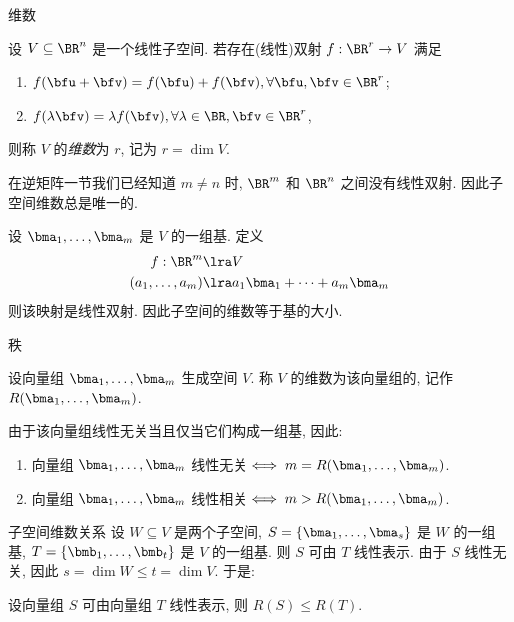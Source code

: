 \begin{frame}{维数}
	\onslide<+->
	\begin{definition}
		设 $V\subseteq \BR^n$ 是一个线性子空间.
		若存在(线性)双射 $f:\BR^r\to V$ 满足
		\begin{enumerate}[<*>]
			\item $f(\bfu+\bfv)=f(\bfu)+f(\bfv),\forall \bfu,\bfv\in\BR^r$;
			\item $f(\lambda\bfv)=\lambda f(\bfv),\forall \lambda\in\BR,\bfv\in\BR^r$,
		\end{enumerate}
		则称 $V$ 的\emph{维数}为 $r$, 记为 $r=\dim V$.
	\end{definition}
	\onslide<+->
	在逆矩阵一节我们已经知道 $m\neq n$ 时, $\BR^m$ 和 $\BR^n$ 之间没有线性双射.
	\onslide<+->
	因此子空间维数总是唯一的.

	\onslide<+->
	设 $\bma_1,\dots,\bma_m$ 是 $V$ 的一组基.
	\onslide<+->
	定义
	\begin{align*}
		f:\BR^m&\lra V\\
		(a_1,\dots,a_m)&\lra a_1\bma_1+\cdots+a_m\bma_m
	\end{align*}
	\onslide<+->
	则该映射是线性双射.
	\onslide<+->
	因此子空间的\alert{维数等于基的大小}.
\end{frame}


\begin{frame}{秩}
	\onslide<+->
	\begin{definition}
		设向量组 $\bma_1,\dots,\bma_m$ 生成空间 $V$.
		称 $V$ 的维数为该向量组的\emph{}, 记作 $R(\bma_1,\dots,\bma_m)$.
	\end{definition}
	\onslide<+->
	由于该向量组线性无关当且仅当它们构成一组基,
	\onslide<+->
	因此:
	\begin{theorem}
		\begin{enumerate}
			\item 向量组 $\bma_1,\dots,\bma_m$ 线性无关$\iff m=R(\bma_1,\dots,\bma_m)$.
			\item 向量组 $\bma_1,\dots,\bma_m$ 线性相关$\iff m>R(\bma_1,\dots,\bma_m)$.
		\end{enumerate}
	\end{theorem}
\end{frame}


\begin{frame}{子空间维数关系}
	\onslide<+->
	设 $W\subseteq V$ 是两个子空间, $S=\{\bma_1,\dots,\bma_s\}$ 是 $W$ 的一组基, $T=\{\bmb_1,\dots,\bmb_t\}$ 是 $V$ 的一组基.
	\onslide<+->
	则 $S$ 可由 $T$ 线性表示.
	\onslide<+->
	由于 $S$ 线性无关, 因此 $s=\dim W\le t=\dim V$.
	\onslide<+->
	于是:
	\begin{theorem}
		设向量组 $S$ 可由向量组 $T$ 线性表示, 则 $R(S)\le R(T)$.
	\end{theorem}
\end{frame}


